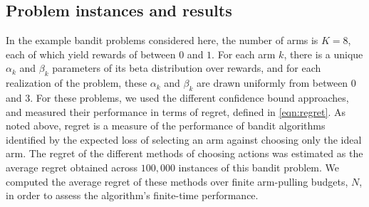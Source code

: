 \documentclass[runningheads, envcountsame, a4paper]{llncs}
\begin{document}
\subsection{Problem instances and results}
In the example bandit problems considered here, the number of arms is $K = 8$, each of which yield rewards of between $0$ and $1$.
For each arm $k$, there is a unique $\alpha_k$ and $\beta_k$ parameters of its beta distribution over rewards, and for each realization of the problem, these $\alpha_k$ and $\beta_k$ are drawn uniformly from between 0 and 3.
%
For these problems, we used the different confidence bound approaches, 
and measured their performance in terms of regret, defined in \eqref{eqn:regret}. 
As noted above, regret is a measure of the performance of bandit algorithms identified by the expected loss of selecting an arm against choosing only the ideal arm.
The regret of the different methods of choosing actions was estimated as the average regret obtained across $100,000$ instances of this bandit problem.
We computed the average regret of these methods over finite arm-pulling budgets, $N$, in order to assess the algorithm's finite-time performance.
\end{document}
